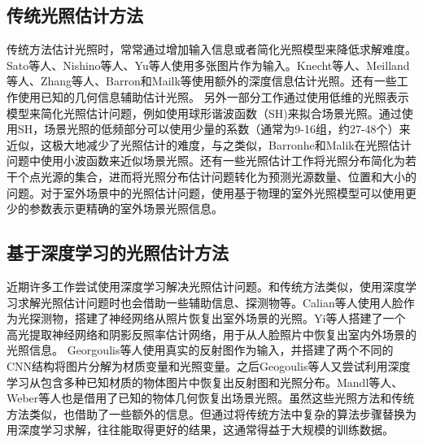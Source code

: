 \subsection{传统光照估计方法}
传统方法估计光照时，常常通过增加输入信息或者简化光照模型来降低求解难度。Sato等人\cite{sato1999acquiring}、Nishino\cite{nishino2001determining}等人、Yu\cite{yu2006sparse}等人使用多张图片作为输入。Knecht\cite{knecht2012reciprocal}等人、Meilland\cite{meilland20133d}等人、Zhang等人\cite{zhang2016emptying}、Barron和Mailk\cite{barron2013intrinsic}等使用额外的深度信息估计光照。还有一些工作使用已知的几何信息辅助估计光照\cite{ramamoorthi2001signal, sato2003illumination, li2003multiple}。
另外一部分工作通过使用低维的光照表示模型来简化光照估计问题，例如使用球形谐波函数（SH)来拟合场景光照\cite{ramamoorthi2001signal,kemelmacher20113d,garrido2013reconstructing,
knorr2014real,li2014intrinsic,barron2015shape, rematas2016deep}。通过使用SH，场景光照的低频部分可以使用少量的系数（通常为9-16组，约27-48个）来近似，这极大地减少了光照估计的难度，与之类似，Barronhe和Malik\cite{okabe2004spherical}在光照估计问题中使用小波函数来近似场景光照。还有一些光照估计工作\cite{sato1999acquiring,  panagopoulos2011illumination, wang2002estimation, li2003multiple, sato2003illumination}将光照分布简化为若干个点光源的集合，进而将光照分布估计问题转化为预测光源数量、位置和大小的问题。对于室外场景中的光照估计问题，使用基于物理的室外光照模型\cite{lalonde2008does, lalonde2010sun, lalonde2012estimating, sunkavalli2008color}可以使用更少的参数表示更精确的室外场景光照信息。
\subsection{基于深度学习的光照估计方法}

近期许多工作尝试使用深度学习解决光照估计问题。和传统方法类似，使用深度学习求解光照估计问题时也会借助一些辅助信息、探测物等。Calian等人\cite{calian2018faces}使用人脸作为光探测物，搭建了神经网络从照片恢复出室外场景的光照。Yi等人\cite{yi2018faces}搭建了一个高光提取神经网络和阴影反照率估计网络，用于从人脸照片中恢复出室内外场景的光照信息。
Georgoulis等人\cite{georgoulis2016delight}使用真实的反射图作为输入，并搭建了两个不同的CNN结构将图片分解为材质变量和光照变量。之后Geogoulis等人\cite{georgoulis2016natural}又尝试利用深度学习从包含多种已知材质的物体图片中恢复出反射图和光照分布。Mandl等人\cite{mandl2017learning}、Weber等人\cite{weber2018learning}也是借用了已知的物体几何恢复出场景光照。虽然这些光照方法和传统方法类似，也借助了一些额外的信息。但通过将传统方法中复杂的算法步骤替换为用深度学习求解，往往能取得更好的结果，这通常得益于大规模的训练数据。

